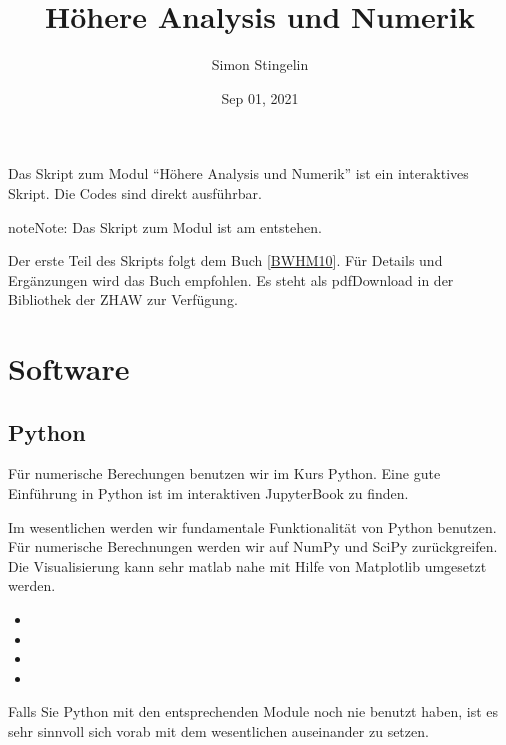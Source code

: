 \documentclass[letterpaper,10pt,english]{jupyterBook}
\title{Höhere Analysis und Numerik}
\date{Sep 01, 2021}
\author{Simon Stingelin}
\begin{document}
\pagestyle{empty}
\sphinxmaketitle
\pagestyle{plain}
\sphinxtableofcontents
\pagestyle{normal}
\label{\detokenize{intro::doc}}


Das Skript zum Modul “Höhere Analysis und Numerik” ist ein interaktives Skript. Die Codes sind direkt ausführbar.

\begin{sphinxadmonition}{note}{Note:}
Das Skript zum Modul ist am entstehen.
\end{sphinxadmonition}

Der erste Teil des Skripts folgt dem Buch {[}\hyperlink{cite.Appendix:id2}{BWHM10}{]}. Für Details und Ergänzungen wird das Buch empfohlen. Es steht als pdf\sphinxhyphen{}Download in der Bibliothek der ZHAW zur Verfügung.


\part{Software}


\chapter{Python}
\label{\detokenize{Software/Python:python}}\label{\detokenize{Software/Python::doc}}
Für numerische Berechungen benutzen wir im Kurs Python. Eine gute Einführung in Python ist im interaktiven Jupyter\sphinxhyphen{}Book  zu finden.

Im wesentlichen werden wir fundamentale Funktionalität von Python benutzen. Für numerische Berechnungen werden wir auf NumPy und SciPy zurückgreifen. Die Visualisierung kann sehr matlab nahe mit Hilfe von Matplotlib umgesetzt werden.
\begin{itemize}
\item {} 

\item {} 

\item {} 

\item {} 

\end{itemize}

Falls Sie Python mit den entsprechenden Module noch nie benutzt haben, ist es sehr sinnvoll sich vorab mit dem wesentlichen auseinander zu setzen.
\end{document}
